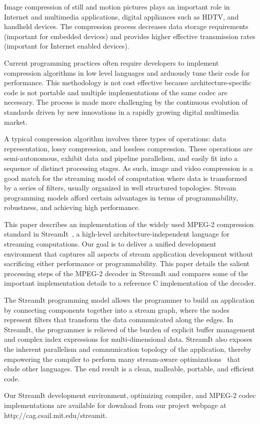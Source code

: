 \vspace{-12pt}
\vspace{-6pt}

Image compression of still and motion pictures plays an important role
in Internet and multimedia applications, digital appliances such as
HDTV, and handheld devices. The compression process decreases data storage
requirements (important for embedded devices) and provides higher
effective transmission rates (important for Internet enabled devices).

Current programming practices often require developers to implement
compression algorithms in low level languages and arduously
tune their code for performance. This methodology is not cost
effective because architecture-specific code is not portable and 
multiple implementations of the same codec are necessary. 
The process is made more challenging by the continuous evolution
of standards driven by new innovations in a rapidly growing 
digital multimedia market.

A typical compression algorithm involves three types of operations:
data representation, lossy compression, and lossless
compression. These operations are semi-autonomous, exhibit data and
pipeline parallelism, and easily fit into a sequence of distinct
processing stages. As such, image and video compression is a good
match for the streaming model of computation where data is transformed
by a series of filters, usually organized in well structured
topologies.  Stream programming models afford certain advantages in
terms of programmability, robustness, and achieving high performance.

This paper describes an implementation of the widely used MPEG-2
compression standard in StreamIt~\cite{streamitcc}, a high-level
architecture-independent language for streaming computations. Our goal
is to deliver a unified development environment that captures all
aspects of stream application development without sacrificing either
performance or programmability. This paper details the salient
processing steps of the MPEG-2 decoder in StreamIt and compares some
of the important implementation details to a reference C
implementation of the decoder.

The StreamIt programming model allows the programmer to build an
application by connecting components together into a stream graph,
where the nodes represent filters that transform the data communicated
along the edges. In StreamIt, the programmer is relieved of the burden
of explicit buffer management and complex index expressions for
multi-dimensional data.  StreamIt also exposes the inherent
parallelism and communication topology of the application, thereby
empowering the compiler to perform many stream-aware
optimizations~\cite{agrawal05cases,gordon02asplos,lamb03pldi,sermulins05lctes}
that elude other languages. The end result is a clean, malleable,
portable, and efficient code.

Our StreamIt development environment, optimizing compiler, and MPEG-2
codec implementations are available for download from our project
webpage at http://cag.csail.mit.edu/streamit.
